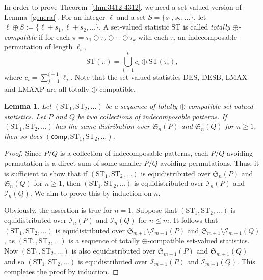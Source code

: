 \documentclass[12pt]{amsart}
\numberwithin{equation}{section}
\def\red{\textcolor{red}}
\theoremstyle{plain}
\newtheorem{lemma}[theorem]{Lemma}
\theoremstyle{definition}
\def\S{\mathfrak{S}}
\def\comp{\mathsf{comp}}
\def\DES{\mathrm{DES}}
\def\LMAX{\mathrm{LMAX}}
\def\LMAXP{\mathrm{LMAXP}}
\def\DESB{\mathrm{DESB}}
\newcommand{\In}{\mathcal{I}}
\def\DESB{\mathrm{DESB}}
\def\ST{\mathrm{ST}}
\begin{document}

In order to prove Theorem~\ref{thm:3412-4312}, we need a set-valued version of Lemma~\ref{general}. For an integer $\ell$ and a set $S=\{s_1,s_2,\ldots\}$, let $\ell\oplus S:=\{\ell+s_1,\ell+s_2,\ldots\}$. A set-valued statistic $\ST$ is called {\em totally $\oplus$-compatible} if for each $\pi=\tau_1\oplus\tau_2\oplus\cdots\oplus\tau_k$ with each $\tau_i$ an indecomposable permutation of length $\ell_i$, 
$$
\ST(\pi)=\bigcup_{i=1}^k c_i\oplus\ST(\tau_i),
$$
where $c_i=\sum_{j=1}^{i-1}\ell_j$. Note that the set-valued statistics $\DES$, $\DESB$, $\LMAX$ and $\LMAXP$ are all totally $\oplus$-compatible. 

\begin{lemma}\label{gen:setv}
Let $(\ST_1,\ST_2,\ldots)$ be a sequence of  totally  $\oplus$-compatible set-valued statistics.
Let $P$ and $Q$ be two collections of indecomposable patterns. If $(\ST_1,\ST_2,\ldots)$ has the same distribution over $\S_n(P)$ and $\S_n(Q)$ for $n\geq1$, then so does $(\comp,\ST_1,\ST_2,\ldots)$.
\end{lemma}
\begin{proof}
Since $P/Q$ is a collection of indecomposable patterns, each $P/Q$-avoiding  permutation is a direct sum of some smaller $P/Q$-avoiding  permutations. Thus, it is sufficient to show that if $(\ST_1,\ST_2,\ldots)$ is equidistributed over $\S_n(P)$ and $\S_n(Q)$ for $n\geq1$, then $(\ST_1,\ST_2,\ldots)$ is equidistributed over $\In_n(P)$ and $\In_n(Q)$. We aim to prove this by induction on $n$. 

Obviously, the assertion is true for $n=1$. Suppose that $(\ST_1,\ST_2,\ldots)$ is equidistributed over $\In_n(P)$ and $\In_n(Q)$ for $n\leq m$. It follows that  $(\ST_1,\ST_2,\ldots)$ is equidistributed over $\S_{m+1}\setminus\In_{m+1}(P)$ and $\S_{m+1}\setminus\In_{m+1}(Q)$, as $(\ST_1,\ST_2,\ldots)$ is a sequence of  totally  $\oplus$-compatible set-valued statistics. Now $(\ST_1,\ST_2,\ldots)$ is also equidistributed over $\S_{m+1}(P)$ and $\S_{m+1}(Q)$ and so $(\ST_1,\ST_2,\ldots)$ is equidistributed over $\In_{m+1}(P)$ and $\In_{m+1}(Q)$. This completes the proof by induction. 
\end{proof}
\end{document}
